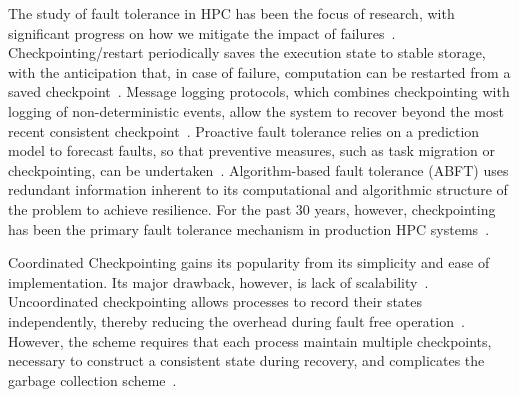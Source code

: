 
The study of fault tolerance in HPC has been the focus of research, with significant progress on how we mitigate the impact of failures~\cite{herault2015fault}. %
Checkpointing/restart periodically saves the execution state to stable storage, with the anticipation that, in case of failure, 
computation can be restarted from a saved checkpoint~\cite{Chandy:1985:DSD:214451.214456}. 
Message logging protocols, which combines checkpointing with logging of non-deterministic events, allow the system to recover beyond the most recent consistent checkpoint~\cite{Strom85optimisticrecovery}. Proactive fault tolerance relies on a prediction model to forecast faults, so that preventive measures, such as task migration or checkpointing, can be undertaken~\cite{gainaru2012fault}. Algorithm-based fault tolerance (ABFT) uses redundant information inherent to its computational and algorithmic structure of the problem to achieve resilience. %
For the past 30 years, however, checkpointing has been the primary fault tolerance mechanism in 
production HPC systems~\cite{ferreira_sc_2011}. 

Coordinated Checkpointing gains its popularity from its simplicity and ease of implementation. Its major drawback, however, is lack of scalability~\cite{hargrove2006berkeley}.
Uncoordinated checkpointing allows processes to record their states independently, thereby reducing the overhead during fault free operation~\cite{guermouche_2011_ipdps}. 
However, the scheme requires that
each process maintain multiple checkpoints, necessary to construct a consistent state during recovery, and complicates the garbage collection scheme~\cite{Elnozahy:02:Survey}. %


